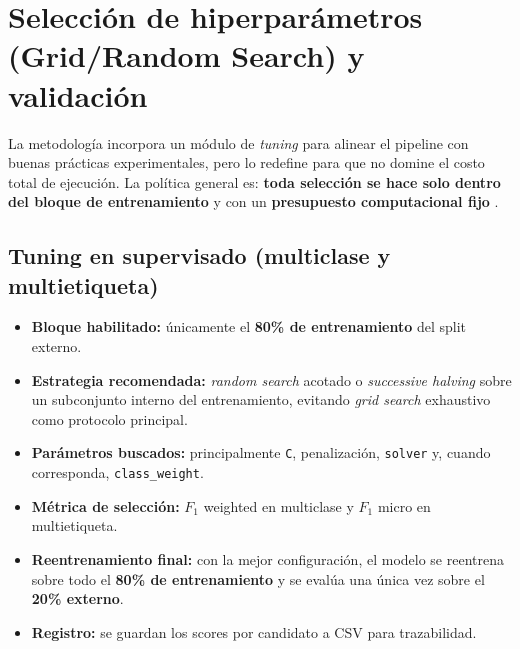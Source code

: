 \documentclass[12pt,oneside]{report}
\begin{document}
\section{Selección de hiperparámetros (Grid/Random Search) y validación}
La metodología incorpora un módulo de \textit{tuning} para alinear el pipeline con buenas prácticas experimentales, pero lo redefine para que no domine el costo total de ejecución. La política general es: \textbf{toda selección se hace solo dentro del bloque de entrenamiento} y con un \textbf{presupuesto computacional fijo} \cite{sklearn_randomsearch,sklearn_halving}.

\subsection{Tuning en supervisado (multiclase y multietiqueta)}
\begin{itemize}[leftmargin=*]
  \item \textbf{Bloque habilitado:} únicamente el \textbf{80\% de entrenamiento} del split externo.
  \item \textbf{Estrategia recomendada:} \textit{random search} acotado o \textit{successive halving} sobre un subconjunto interno del entrenamiento, evitando \textit{grid search} exhaustivo como protocolo principal.
  \item \textbf{Parámetros buscados:} principalmente \texttt{C}, penalización, \texttt{solver} y, cuando corresponda, \texttt{class\_weight}.
  \item \textbf{Métrica de selección:} $F_1$ weighted en multiclase y $F_1$ micro en multietiqueta.
  \item \textbf{Reentrenamiento final:} con la mejor configuración, el modelo se reentrena sobre todo el \textbf{80\% de entrenamiento} y se evalúa una única vez sobre el \textbf{20\% externo}.
  \item \textbf{Registro:} se guardan los scores por candidato a CSV para trazabilidad.
\end{itemize}
\end{document}
